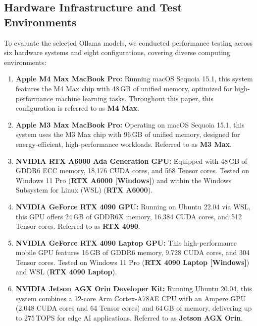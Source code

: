 \documentclass[conference]{IEEEtran}
\begin{document}
\subsection{Hardware Infrastructure and Test Environments}

To evaluate the selected Ollama models, we conducted performance testing across six hardware systems and eight configurations, covering diverse computing environments:

\begin{enumerate}
    \item \textbf{Apple M4 Max MacBook Pro:} Running macOS Sequoia 15.1, this system features the M4 Max chip with 48\,GB of unified memory, optimized for high-performance machine learning tasks. Throughout this paper, this configuration is referred to as \textbf{M4 Max}.
    
    \item \textbf{Apple M3 Max MacBook Pro:} Operating on macOS Sequoia 15.1, this system uses the M3 Max chip with 96\,GB of unified memory, designed for energy-efficient, high-performance workloads. Referred to as \textbf{M3 Max}.
    
    \item \textbf{NVIDIA RTX A6000 Ada Generation GPU:} Equipped with 48\,GB of GDDR6 ECC memory, 18,176 CUDA cores, and 568 Tensor cores. Tested on Windows 11 Pro (\textbf{RTX A6000 [Windows]}) and within the Windows Subsystem for Linux (WSL) (\textbf{RTX A6000}).
    
    \item \textbf{NVIDIA GeForce RTX 4090 GPU:} Running on Ubuntu 22.04 via WSL, this GPU offers 24\,GB of GDDR6X memory, 16,384 CUDA cores, and 512 Tensor cores. Referred to as \textbf{RTX 4090}.
    
    \item \textbf{NVIDIA GeForce RTX 4090 Laptop GPU:} This high-performance mobile GPU features 16\,GB of GDDR6 memory, 9,728 CUDA cores, and 304 Tensor cores. Tested on Windows 11 Pro (\textbf{RTX 4090 Laptop [Windows]}) and WSL (\textbf{RTX 4090 Laptop}).
    
    \item \textbf{NVIDIA Jetson AGX Orin Developer Kit:} Running Ubuntu 20.04, this system combines a 12-core Arm Cortex-A78AE CPU with an Ampere GPU (2,048 CUDA cores and 64 Tensor cores) and 64\,GB of memory, delivering up to 275\,TOPS for edge AI applications. Referred to as \textbf{Jetson AGX Orin}.

\end{enumerate}
\end{document}
